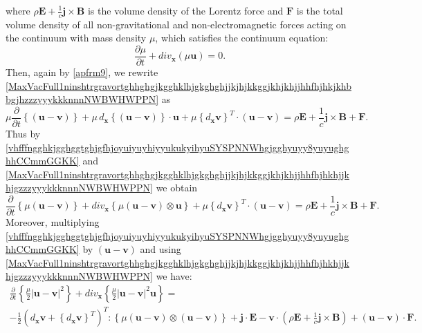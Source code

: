 \documentclass{article}
\theoremstyle{definition}
\theoremstyle{remark}
\renewcommand{\vec}[1]{\mathbf{#1}}
\newcommand{\er}{\eqref}
\newcommand{\er}{\eqref}
\begin{document}
where $\rho\vec E+\frac{1}{c}\vec j\times\vec B$ is the volume
density of the Lorentz force and $\vec F$ is the total volume
density of all non-gravitational and non-electromagnetic forces
acting on the continuum with mass density $\mu$, which satisfies the
continuum equation:
\begin{equation}\label{MaxVacFull1ninshtrgravortghhghgjkgghklhjgkghghjjkjhjkkggjkhjkhjjhhfhjhkhjjkhjgzzzyyykkknnnNWBWHWPPN}
\frac{\partial\mu}{\partial t}+div_{\vec x}\left(\mu\vec u\right)=0.
\end{equation}
Then, again by \er{apfrm9}, we rewrite
\er{MaxVacFull1ninshtrgravortghhghgjkgghklhjgkghghjjkjhjkkggjkhjkhjjhhfhjhkjkhbbgjhzzzyyykkknnnNWBWHWPPN}
as
\begin{equation}\label{vhfffngghkjgghggtghjgfhjoyuiyuyhiyyukukyihyuSYSPNNWhgjgghyuyy8yuyughghhCCmmGGKK}
\mu\frac{\partial}{\partial t}\left\{\left(\vec u-\vec v\right)
\right\} + \mu \,d_{\vec x}\left\{\left(\vec u-\vec
v\right)\right\}\cdot\vec u +\mu \left\{d_{\vec x}\vec
v\right\}^T\cdot\left(\vec u-\vec v\right)=\rho\vec
E+\frac{1}{c}\vec j\times \vec B+\vec F.
\end{equation}
Thus by
\er{vhfffngghkjgghggtghjgfhjoyuiyuyhiyyukukyihyuSYSPNNWhgjgghyuyy8yuyughghhCCmmGGKK}
and
\er{MaxVacFull1ninshtrgravortghhghgjkgghklhjgkghghjjkjhjkkggjkhjkhjjhhfhjhkhjjkhjgzzzyyykkknnnNWBWHWPPN}
we obtain
\begin{equation}\label{vhfffngghkjgghggtghjgfhjoyuiyuyhiyyukukyihyuSYSPNNWhgjgghyuyy8yuyughghhghghhjjhCCmmGGKK}
\frac{\partial}{\partial t}\left\{ \mu \left(\vec u-\vec v\right)
\right\} + div_{\vec x}\left\{\mu \left(\vec u-\vec
v\right)\otimes\vec u\right\} +\mu \left\{d_{\vec x}\vec
v\right\}^T\cdot\left(\vec u-\vec v\right)=\rho\vec
E+\frac{1}{c}\vec j\times \vec B+\vec F.
\end{equation}
Moreover, multiplying
\er{vhfffngghkjgghggtghjgfhjoyuiyuyhiyyukukyihyuSYSPNNWhgjgghyuyy8yuyughghhCCmmGGKK}
by $(\vec u-\vec v)$ and using
\er{MaxVacFull1ninshtrgravortghhghgjkgghklhjgkghghjjkjhjkkggjkhjkhjjhhfhjhkhjjkhjgzzzyyykkknnnNWBWHWPPN}
we have:
\begin{multline}\label{vhfffngghkjgghggtghjgfhjoyuiyuyhiyyukukyihyuSYSPNNWhgjgghyuyy8yuyughghhyttyytCCmmGGKK}
\frac{\partial}{\partial t}\left\{\frac{\mu}{2}\left|\vec u-\vec
v\right|^2\right\}+div_{\vec x}\left\{\frac{\mu}{2}\left|\vec u-\vec
v\right|^2\vec u\right\}=
\\ -\frac{1}{2}\left(d_{\vec x}\vec v+\left\{d_{\vec x}\vec v\right\}^T\right)^T:\left\{\mu\left(\vec u-\vec v\right)\otimes \left(\vec
u-\vec v\right)\right\}+\vec j\cdot\vec E -\vec v\cdot\left(\rho\vec
E+\frac{1}{c}\vec j\times \vec B\right)+(\vec u-\vec v)\cdot\vec F.
\end{multline}
\end{document}
